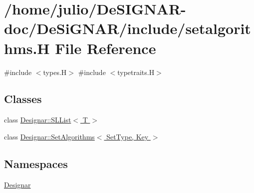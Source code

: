 \hypertarget{setalgorithms_8_h}{}\section{/home/julio/\+De\+S\+I\+G\+N\+A\+R-\/doc/\+De\+Si\+G\+N\+A\+R/include/setalgorithms.H File Reference}
\label{setalgorithms_8_h}
{\ttfamily \#include $<$types.\+H$>$}\newline
{\ttfamily \#include $<$typetraits.\+H$>$}\newline
\subsection*{Classes}
\begin{DoxyCompactItemize}
\item 
class \hyperlink{class_designar_1_1_s_l_list}{Designar\+::\+S\+L\+List$<$ T $>$}
\item 
class \hyperlink{class_designar_1_1_set_algorithms}{Designar\+::\+Set\+Algorithms$<$ Set\+Type, Key $>$}
\end{DoxyCompactItemize}
\subsection*{Namespaces}
\begin{DoxyCompactItemize}
\item 
 \hyperlink{namespace_designar}{Designar}
\end{DoxyCompactItemize}
